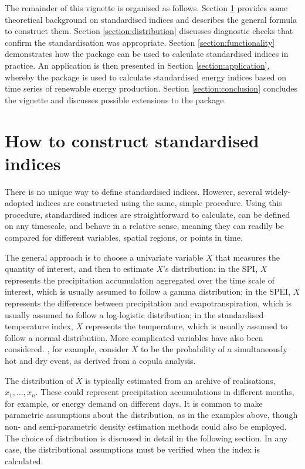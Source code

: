 \documentclass[article,shortnames,nojss]{jss}\usepackage[]{graphicx}\usepackage[]{xcolor}
\begin{document}
The remainder of this vignette is organised as follows. Section \ref{section:theory} provides some theoretical background on standardised indices and describes the general formula to construct them. Section \ref{section:distribution} discusses diagnostic checks that confirm the standardisation was appropriate. Section \ref{section:functionality} demonstrates how the  package can be used to calculate standardised indices in practice. An application is then presented in Section \ref{section:application}, whereby the  package is used to calculate standardised energy indices based on time series of renewable energy production. Section \ref{section:conclusion} concludes the vignette and discusses possible extensions to the package.


\section{How to construct standardised indices}\label{section:theory}

There is no unique way to define standardised indices. However, several widely-adopted indices are constructed using the same, simple procedure. Using this procedure, standardised indices are straightforward to calculate, can be defined on any timescale, and behave in a relative sense, meaning they can readily be compared for different variables, spatial regions, or points in time.

The general approach is to choose a univariate variable $X$ that measures the quantity of interest, and then to estimate $X$'s distribution: in the SPI, $X$ represents the precipitation accumulation aggregated over the time scale of interest, which is usually assumed to follow a gamma distribution; in the SPEI, $X$ represents the difference between precipitation and evapotranspiration, which is usually assumed to follow a log-logistic distribution; in the standardised temperature index, $X$ represents the temperature, which is usually assumed to follow a normal distribution. More complicated variables have also been considered. \cite{HaoEtAl2019}, for example, consider $X$ to be the probability of a simultaneously hot and dry event, as derived from a copula analysis.

The distribution of $X$ is typically estimated from an archive of realisations, $x_{1}, \dots, x_{n}$. These could represent precipitation accumulations in different months, for example, or energy demand on different days. It is common to make parametric assumptions about the distribution, as in the examples above, though non- and semi-parametric density estimation methods could also be employed. The choice of distribution is discussed in detail in the following section. In any case, the distributional assumptions must be verified when the index is calculated.
\end{document}
